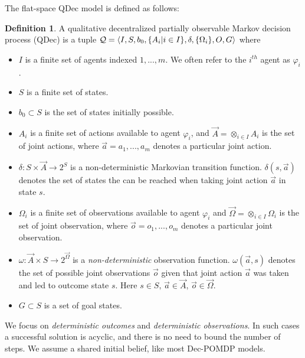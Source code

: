 \documentclass[letterpaper]{article}
\theoremstyle{definition}
\newtheorem{definition}{Definition}[section]
\begin{document}
The flat-space QDec model is defined as follows:
\begin{definition} A qualitative decentralized partially observable Markov decision process
(QDec) is a tuple ${\cal Q} = \langle  I, S, b_0,\{A_i | i\in I\}, \delta, \{\Omega_i\}, O, G\rangle$
where
\begin{itemize}
\item $I$ is a finite set of agents indexed $1,...,m$. We often refer to the $i^{th}$ agent as $\varphi_i$.

\item $S$ is a finite set of states.

\item$b_0 \subset S$ is the set of states initially possible.

\item  $A_i$ is a finite set of actions available to agent $\varphi_i$,
and $\vec{A} = \otimes_{i \in I} A_i$ is the set of joint actions,
where
$\vec{a} = {a_1,...,a_m}$ denotes a particular joint action.

\item $\delta: S \times \vec{A} \rightarrow 2^S$ is a non-deterministic Markovian transition function. $\delta(s, \vec{a})
$ denotes the set of states the can be reached when taking joint action $\vec{a}$ in state $s$.

\item $\Omega_i$ is a finite set of observations available to agent $\varphi_i$ and
$\vec{\Omega} = \otimes_{i \in I} \Omega_i$ is the set of joint
observation, where $\vec{o} = {o_1,...,o_m}$ denotes a particular joint
observation.

\item $\omega : \vec{A} \times S \rightarrow 2^{\vec{\Omega}}$ is a {\em non-deterministic\/} observation function. $\omega(\vec{a}, s)$
denotes the set of possible joint observations $\vec{o}$ given that
joint action $\vec{a}$ was taken and led to outcome state $s$. Here $s \in S,\, \vec{a}
\in \vec{A},\, \vec{o} \in \vec{\Omega}$.

\item $G \subset S$ is a set of goal states.

\end{itemize}
\label{11_def:DEC-POMDP}
\end{definition}

We focus on {\em deterministic outcomes} and {\em deterministic observations}. In such cases a successful solution is acyclic, and there is no need to bound the number of steps.
We assume a shared initial belief, like most Dec-POMDP models.
\end{document}
